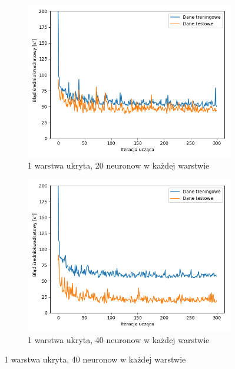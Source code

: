 \documentclass[12pt]{aghdpl}
\begin{document}
		\begin{figure}[h]
			\begin{center}
			\begin{subfigure}{.8\textwidth}
		 		\includegraphics[width =\linewidth]{wykresy/3_drugi_model_tworzenie_i_analiza/wykres_uczenia.png}
		 		\caption{1 warstwa ukryta, 20 neuronow w każdej warstwie}
		 	\end{subfigure}
		 	\begin{subfigure}{.8\linewidth}
		 		\includegraphics[width =\linewidth]{wykresy/4_zwiekszenie_stopnia_skomplikowania_modelu/1_warstwa_40_neuronow_wykres_uczenia.png}
		 		\caption{1 warstwa ukryta, 40 neuronow w każdej warstwie}
		 	\end{subfigure}
		 	

\end{center}
\end{figure}
\end{document}
